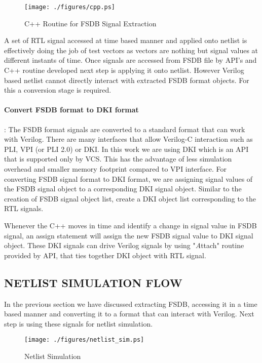 \begin{figure}[H]
\centering
\texttt{[image: ./figures/cpp.ps]}
\caption{C++ Routine for FSDB Signal Extraction}
\label{fig:cpp.eps}
\end{figure}




A set of RTL signal accessed at time based manner and applied onto netlist is effectively doing the job of test vectors as vectors are nothing but signal values at different instants of time.
Once signals are accessed from FSDB file by API's and C++ routine developed next step is applying it onto netlist. However Verilog based netlist cannot directly interact with extracted FSDB format objects. For this a conversion stage is required.  




\paragraph{Convert FSDB format to DKI format}: The FSDB format signals are converted to a standard format that can work with Verilog. There are many interfaces that allow Verilog-C interaction such as PLI, VPI (or PLI 2.0) or DKI. 
In this work we are using DKI which is an API that is supported only by VCS. This has the advantage of less simulation overhead and smaller memory footprint compared to VPI interface.
For converting FSDB signal format to DKI format, we are assigning signal values of the FSDB signal object to a corresponding DKI signal object. Similar to the creation of FSDB signal object list, create a DKI object list corresponding to the RTL signals. 

Whenever the C++ moves in time and identify a change in signal value in FSDB signal, an assign statement will assign the new FSDB signal value to DKI signal object.  These DKI signals can drive Verilog signals by using "{\emph Attach}" routine provided by API, that ties together DKI object with RTL signal. 

\subsection{NETLIST SIMULATION FLOW}
In the previous section we have discussed extracting FSDB, accessing it in a time based manner and converting it to a format that can interact with Verilog. Next step is using these signals for netlist simulation.


\begin{figure}[H]
\centering
\texttt{[image: ./figures/netlist\_sim.ps]}
\caption{Netlist Simulation}
\label{fig:netlist_sim.eps}
\end{figure}

